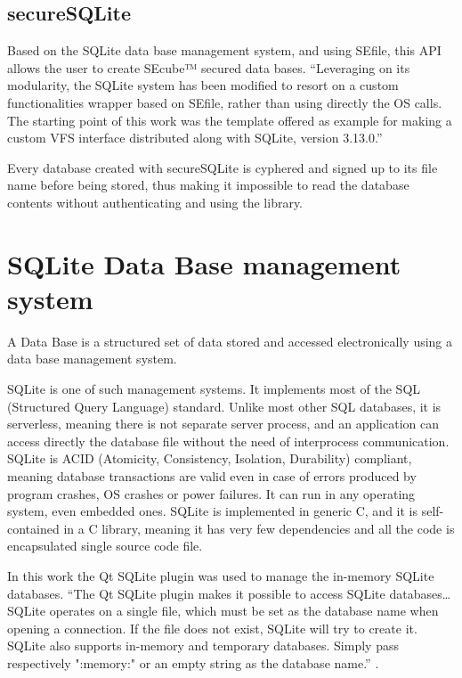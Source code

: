 \subsection{secureSQLite}

Based on the SQLite data base management system, and using SEfile, this API allows the user to create SEcube™ secured data bases.
``Leveraging on its modularity, the SQLite system has been modified to resort on a custom functionalities wrapper based on SEfile, rather than using directly the OS calls. The starting point of this work was the template offered as example for making a custom VFS interface distributed along with SQLite, version 3.13.0.''\cite{L2UserMan}

Every database created with secureSQLite is cyphered and signed up to its file name before being stored, thus making it impossible to read the database contents without authenticating and using the library.

\section{SQLite Data Base management system}
A Data Base is a structured set of data stored and accessed electronically using a data base management system. 

SQLite \cite{SQLite} is one of such management systems. It implements most of the SQL (Structured Query Language) standard. Unlike most other SQL databases, it is serverless, meaning there is not separate server process, and an application can access directly the database file without the need of interprocess communication. SQLite is ACID (Atomicity, Consistency, Isolation, Durability) compliant, meaning database transactions are valid even in case of errors produced by program crashes, OS crashes or power failures. It can run in any operating system, even embedded ones. SQLite is implemented in generic C, and it is self-contained in a C library, meaning it has very few dependencies and all the code is encapsulated single source code file. 

In this work the Qt SQLite plugin was used to manage the in-memory SQLite databases. ``The Qt SQLite plugin makes it possible to access SQLite databases\dots SQLite operates on a single file, which must be set as the database name when opening a connection. If the file does not exist, SQLite will try to create it. SQLite also supports in-memory and temporary databases. Simply pass respectively ":memory:" or an empty string as the database name.'' \cite{qsqlite}.

